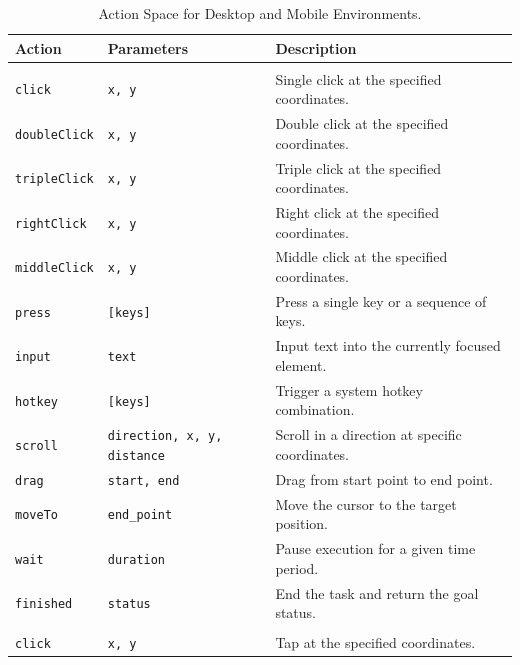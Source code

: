 \documentclass{article}
\theoremstyle{plain}
\theoremstyle{definition}
\theoremstyle{remark}
\begin{document}
\begin{table}[t]
\centering
\caption{Action Space for Desktop and Mobile Environments.}
\label{tab: action_space}
\small
\renewcommand{\arraystretch}{1.1} %
\begin{tabular}{l l p{8cm}} %
\toprule
 \textbf{Action} & \textbf{Parameters} & \textbf{Description} \\
\midrule
\rowcolor[gray]{0.9}\multicolumn{3}{l}{\textit{\textbf{Desktop Actions}}} \\ 
\midrule
\texttt{click}        & \texttt{x, y}             & Single click at the specified coordinates. \\
\texttt{doubleClick}  & \texttt{x, y}             & Double click at the specified coordinates. \\
\texttt{tripleClick}  & \texttt{x, y}             & Triple click at the specified coordinates. \\
\texttt{rightClick}   & \texttt{x, y}             & Right click at the specified coordinates. \\
\texttt{middleClick}  & \texttt{x, y}             & Middle click at the specified coordinates. \\
\texttt{press}        & \texttt{[keys]}           & Press a single key or a sequence of keys. \\
\texttt{input}        & \texttt{text}             & Input text into the currently focused element. \\
\texttt{hotkey}       & \texttt{[keys]}           & Trigger a system hotkey combination. \\
\texttt{scroll}       & \texttt{direction, x, y, distance}  & Scroll in a direction at specific coordinates. \\
\texttt{drag}         & \texttt{start, end}       & Drag from start point to end point. \\
\texttt{moveTo}       & \texttt{end\_point}       & Move the cursor to the target position. \\
\texttt{wait}         & \texttt{duration}         & Pause execution for a given time period. \\
\texttt{finished}     & \texttt{status}           & End the task and return the goal status. \\
\midrule
\rowcolor[gray]{0.9}\multicolumn{3}{l}{\textit{\textbf{Mobile Actions}}} \\ 
\midrule
\texttt{click}        & \texttt{x, y}             & Tap at the specified coordinates. \\

\end{tabular}
\end{table}
\end{document}
